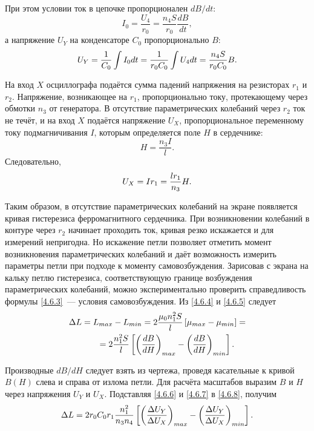  При этом условии ток в цепочке пропорционален $dB/dt$:
\begin{equation*}
	I_0 = \frac{U_4}{r_0} = \frac{n_4S}{r_0}\frac{dB}{dt},
\end{equation*}
а напряжение $U_Y$ на конденсаторе $C_0$ пропорционально $B$:
\begin{equation}
	\eqmark{4.6.6}
	U_Y = \frac{1}{C_0}\int I_0dt = \frac{1}{r_0C_0}\int U_4dt = \frac{n_4S}{r_0C_0}B.
\end{equation}

На вход $X$ осциллографа подаётся сумма падений напряжения на резисторах $r_1$ и $r_2$. Напряжение, возникающее на $r_1$, пропорционально току, протекающему через обмотки $n_3$ от генератора. В отсутствие параметрических колебаний через $r_2$ ток не течёт, и на вход $X$ подаётся напряжение $U_X$, пропорциональное переменному току подмагничивания $I$, которым определяется поле $H$ в сердечнике:
\begin{equation*}
	H = \frac{n_3I}{l}.
\end{equation*}
Следовательно,
\begin{equation}
	\eqmark{4.6.7}
	U_X = Ir_1 = \frac{lr_1}{n_3}H.
\end{equation}

Таким образом, в отсутствие параметрических колебаний на экране появляется кривая гистерезиса ферромагнитного сердечника. При возникновении колебаний в контуре через $r_2$ начинает проходить ток, кривая резко искажается и для измерений непригодна. Но искажение петли позволяет отметить момент возникновения параметрических колебаний и даёт возможность измерить параметры петли при подходе к моменту самовозбуждения. Зарисовав с экрана на кальку петлю гистерезиса, соответствующую границе возбуждения параметрических колебаний, можно экспериментально проверить справедливость формулы \eqref{4.6.3}~--- условия самовозбуждения. Из \eqref{4.6.4} и \eqref{4.6.5} следует
\begin{equation}
	\eqmark{4.6.8}
	\begin{aligned}
		\Delta L = L_{max}& - L_{min} = 2\frac{\mu_0n^2_1S}{l}\left[\mu_{max} - \mu_{min}\right] = \\
		= 2&\frac{n^2_1S}{l}\left[\left(\frac{dB}{dH}\right)_{max} - \left(\frac{dB}{dH}\right)_{min}\right].
	\end{aligned}
\end{equation}

Производные $dB/dH$ следует взять из чертежа, проведя касательные к кривой $B(H)$ слева и справа от излома петли. Для расчёта масштабов выразим $B$ и $H$ через напряжения $U_Y$ и $U_X$. Подставляя \eqref{4.6.6} и \eqref{4.6.7} в \eqref{4.6.8}, получим
\begin{equation}
	\eqmark{4.6.9}
	\Delta L = 2r_0C_0r_1\frac{n^2_1}{n_3n_4}\left[\left(\frac{\Delta U_Y}{\Delta U_X}\right)_{max} - \left(\frac{\Delta U_Y}{\Delta U_X}\right)_{min}\right].
\end{equation}

